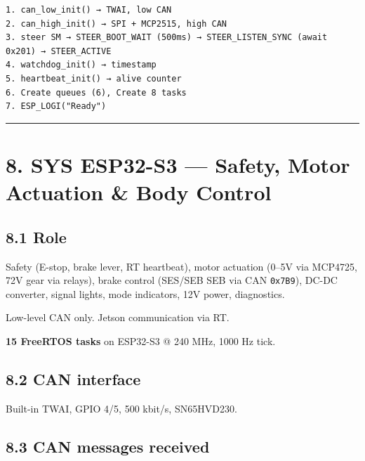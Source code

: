 \begin{verbatim}
1. can_low_init() → TWAI, low CAN
2. can_high_init() → SPI + MCP2515, high CAN
3. steer SM → STEER_BOOT_WAIT (500ms) → STEER_LISTEN_SYNC (await 0x201) → STEER_ACTIVE
4. watchdog_init() → timestamp
5. heartbeat_init() → alive counter
6. Create queues (6), Create 8 tasks
7. ESP_LOGI("Ready")
\end{verbatim}

\begin{center}\rule{0.5\linewidth}{0.5pt}\end{center}

\section{8. SYS ESP32-S3 --- Safety, Motor Actuation \& Body
Control}\label{sys-esp32-s3-safety-motor-actuation-body-control}

\subsection{8.1 Role}\label{role-1}

Safety (E-stop, brake lever, RT heartbeat), motor actuation (0--5V via MCP4725,
72V gear via relays), brake control (SES/SEB SEB via CAN \texttt{0x7B9}), DC-DC
converter, signal lights, mode indicators, 12V power, diagnostics.

Low-level CAN only. Jetson communication via RT.

\textbf{15 FreeRTOS tasks} on ESP32-S3 @ 240 MHz, 1000 Hz tick.

\subsection{8.2 CAN interface}\label{can-interface}

Built-in TWAI, GPIO 4/5, 500 kbit/s, SN65HVD230.

\subsection{8.3 CAN messages received}\label{can-messages-received-1}

